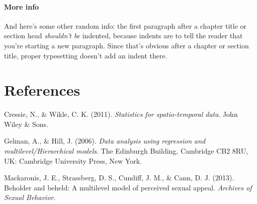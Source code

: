 \documentclass[12pt,twoside]{reedthesis}
\begin{document}
  \subsubsection{More info}\label{more-info}
  
  And here's some other random info: the first paragraph after a chapter
  title or section head \emph{shouldn't be} indented, because indents are
  to tell the reader that you're starting a new paragraph. Since that's
  obvious after a chapter or section title, proper typesetting doesn't add
  an indent there.
  
  \backmatter
  
  \chapter{References}\label{references}
  
  \noindent
  
  \setlength{\parindent}{-0.20in} \setlength{\leftskip}{0.20in}
  \setlength{\parskip}{8pt}
  
  Cressie, N., \& Wikle, C. K. (2011). \emph{Statistics for
  spatio-temporal data}. John Wiley \& Sons.
  
  Gelman, A., \& Hill, J. (2006). \emph{Data analysis using regression and
  multilevel/Hierarchical models}. The Edinburgh Building, Cambridge CB2
  8RU, UK: Cambridge University Press, New York.
  
  Mackaronis, J. E., Strassberg, D. S., Cundiff, J. M., \& Cann, D. J.
  (2013). Beholder and beheld: A multilevel model of perceived sexual
  appeal. \emph{Archives of Sexual Behavior}.


\end{document}
